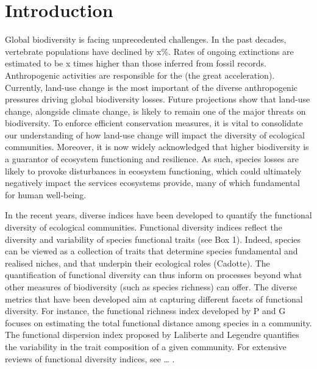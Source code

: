\section{Introduction}
Global biodiversity is facing unprecedented challenges. In the past decades, vertebrate populations have declined by x\%.  Rates of ongoing extinctions are estimated to be x times higher than those inferred from fossil records. Anthropogenic activities are responsible for the (the great acceleration). Currently, land-use change is the most important of the diverse anthropogenic pressures driving global biodiversity losses. Future projections show that land-use change, alongside climate change, is likely to remain one of the major threats on biodiversity. To enforce efficient conservation measures, it is vital to consolidate our understanding of how land-use change will impact the diversity of ecological communities. Moreover, it is now widely acknowledged that higher biodiversity is a guarantor of ecosystem functioning and resilience. As such, species losses are likely to provoke disturbances in ecosystem functioning, which could ultimately negatively impact the services ecosystems provide, many of which fundamental for human well-being.

In the recent years, diverse indices have been developed to quantify the functional diversity of ecological communities. Functional diversity indices reflect the diversity and variability of species functional traits (see Box 1). Indeed, species can be viewed as a collection of traits that determine species fundamental and realised niches, and that underpin their ecological roles (Cadotte). The quantification of functional diversity can thus inform on processes beyond what other measures of biodiversity (such as species richness) can offer. The diverse metrics that have been developed aim at capturing different facets of functional diversity. For instance, the functional richness index developed by P and G focuses on estimating the total functional distance among species in a community. The functional dispersion index proposed by Laliberte and Legendre quantifies the variability in the trait composition of a given community. For extensive reviews of functional diversity indices, see … . 

